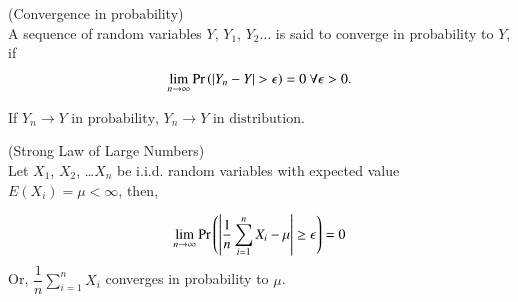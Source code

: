 \documentclass[journal,12pt,twocolumn]{IEEEtran}
\begin{document}
\begin{definition} \label{def2}
    (Convergence in probability)\\
    A sequence of random variables $Y$, $Y_1$, $Y_2 \ldots$ is said to converge in probability to $Y$, if
    \begin{align}
        \lim_{n \to \infty}\Pr\left(\vert Y_n - Y\vert > \epsilon\right) = 0  \text{  }\forall \epsilon > 0.
    \end{align}
\end{definition}

\begin{lemma}\label{lma1}
    If
    \begin{math}
    {Y_n} \to Y \text{ in probability, }{Y_n} \to Y \text{ in distribution.}
    \end{math}
\end{lemma}


\begin{lemma}\label{lma3}
    (Strong Law of Large Numbers)\\ 
Let $X_1$, $X_2$, \ldots $X_n$ be i.i.d. random variables with expected value $E(X_i)=\mu < \infty$, then,

\begin{align}
    \lim_{n \to \infty}\Pr\left(\left|\dfrac{1}{n}\sum_{i=1}^n X_i - \mu \right|\geq \epsilon\right)=0
\end{align}
Or, 
\begin{math}
    \dfrac{1}{n}\sum_{i=1}^n X_i
\end{math}
converges in probability to $\mu$.
\end{lemma}
\end{document}
